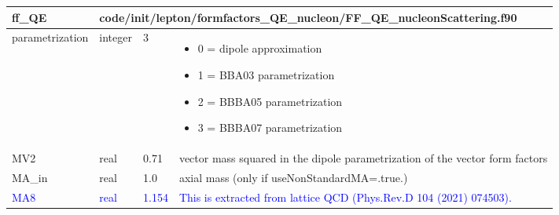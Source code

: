 \documentclass{article}
\begin{document}

\begin{longtable}{llll}
\toprule
\textbf{\large{ff\_QE}} & \multicolumn{3}{l}{\footnotesize{code/init/lepton/formfactors\_QE\_nucleon/FF\_QE\_nucleonScattering.f90}}\\*
\midrule
\endfirsthead
\midrule
\endhead
parametrization & \begin{minipage}[t]{2cm}integer\end{minipage} & \begin{minipage}[t]{2cm}3\end{minipage} & \begin{minipage}[t]{12cm}\begin{itemize}\leftmargin0em\itemindent0pt\item 0 = dipole approximation\item 1 = BBA03 parametrization\item 2 = BBBA05 parametrization\item 3 = BBBA07 parametrization\end{itemize}\end{minipage}\\*
\midrule
MV2 & \begin{minipage}[t]{2cm}real\end{minipage} & \begin{minipage}[t]{2cm}0.71\end{minipage} & \begin{minipage}[t]{12cm}vector mass squared in the dipole parametrization of the vector form factors\end{minipage}\\*
\midrule
MA\_in & \begin{minipage}[t]{2cm}real\end{minipage} & \begin{minipage}[t]{2cm}1.0\end{minipage} & \begin{minipage}[t]{12cm}axial mass (only if useNonStandardMA=.true.)\end{minipage}\\*
\midrule
\textcolor{blue}{MA8} & \begin{minipage}[t]{2cm}\textcolor{blue}{real}\end{minipage} & \begin{minipage}[t]{2cm}\textcolor{blue}{1.154}\end{minipage} & \begin{minipage}[t]{12cm}\textcolor{blue}{This is extracted from lattice QCD (Phys.Rev.D 104 (2021) 074503).}\end{minipage}\\*

\end{longtable}
\end{document}
